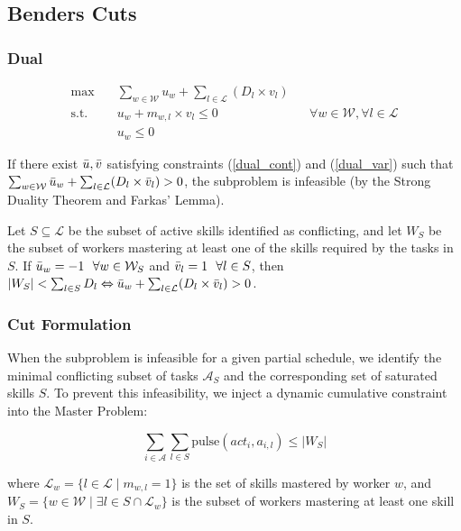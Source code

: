 \documentclass[preprint, authoryear,11pt]{elsarticle}
\begin{document}
\subsection{Benders Cuts} \label{sec:coupes}

\subsubsection{Dual}
\begin{align}
    \max \quad & \sum_{w \in \mathcal{W}} u_w + \sum_{ l \in \mathcal{L}}( D_l \times v_l) \label{obj_dual} \\
    \text{s.t.} \quad & u_w + m_{w,l} \times v_l \leq 0 && \forall w \in \mathcal{W}, \forall l \in \mathcal{L} \label{dual_cont}\\
    & u_w \leq 0 && \label{dual_var}
\end{align}

If there exist $\Bar{u},\Bar{v}$ satisfying constraints (\ref{dual_cont}) and (\ref{dual_var}) such that $\sum_{w \in \mathcal{W}} \Bar{u}_w + \sum_{ l \in \mathcal{L}}( D_l \times \Bar{v}_l) > 0$, the subproblem is infeasible (by the Strong Duality Theorem and Farkas' Lemma).

Let $S \subseteq \mathcal{L}$ be the subset of active skills identified as conflicting, and let $W_S$ be the subset of workers mastering at least one of the skills required by the tasks in $S$. 
If $\Bar{u}_w = - 1 ~~\forall w \in \mathcal{W}_S$ and $\Bar{v}_l = 1 ~~ \forall l \in S$, then $|W_S| < \sum_{l \in S} D_l \Leftrightarrow  \Bar{u}_w + \sum_{ l \in \mathcal{L}}( D_l \times \Bar{v}_l) > 0 $.

\subsubsection{Cut Formulation}
When the subproblem is infeasible for a given partial schedule, we identify the minimal conflicting subset of tasks $\mathcal{A}_S$ and the corresponding set of saturated skills $S$. To prevent this infeasibility, we inject a dynamic cumulative constraint into the Master Problem:

\begin{equation}
    \sum_{i \in \mathcal{A}} \sum_{l \in S} \text{pulse}(act_{i}, a_{i,l}) \le |W_S| \label{eq:benders_cut}
\end{equation}

where $\mathcal{L}_w = \{ l \in \mathcal{L} \mid m_{w,l} = 1 \}$ is the set of skills mastered by worker $w$, and $W_S = \{w \in \mathcal{W} \mid \exists l \in S \cap \mathcal{L}_w\}$ is the subset of workers mastering at least one skill in $S$.
\end{document}
